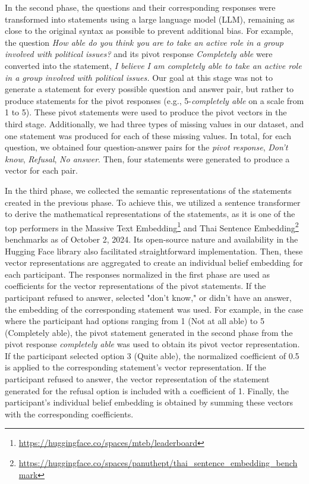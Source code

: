 In the second phase, the questions and their corresponding responses were transformed into statements using a large language model (LLM), remaining as close to the original syntax as possible to prevent additional bias. For example, the question \textit{How able do you think you are to take an active role in a group involved with political issues?} and its pivot response \textit{Completely able} were converted into the statement, \textit{I believe I am completely able to take an active role in a group involved with political issues.} Our goal at this stage was not to generate a statement for every possible question and answer pair, but rather to produce statements for the pivot responses (e.g., 5-\textit{completely able} on a scale from 1 to 5). These pivot statements were used to produce the pivot vectors in the third stage. Additionally, we had three types of missing values in our dataset, and one statement was produced for each of these missing values. In total, for each question, we obtained four question-answer pairs for the \textit{pivot response}, \textit{Don't know}, \textit{Refusal}, \textit{No answer}. Then, four statements were generated to produce a vector for each pair.

In the third phase, we collected the semantic representations of the statements created in the previous phase. To achieve this, we utilized a sentence transformer \cite[\textit{BGE-M3}]{chen2024bge} to derive the mathematical representations of the statements, as it is one of the top performers in the Massive Text Embedding\footnote{\url{https://huggingface.co/spaces/mteb/leaderboard}} and Thai Sentence Embedding\footnote{\url{https://huggingface.co/spaces/panuthept/thai_sentence_embedding_benchmark}} benchmarks as of October 2, 2024. Its open-source nature and availability in the Hugging Face library also facilitated straightforward implementation. Then, these vector representations are aggregated to create an individual belief embedding for each participant. The responses normalized in the first phase are used as coefficients for the vector representations of the pivot statements. If the participant refused to answer, selected "don't know," or didn't have an answer, the embedding of the corresponding statement was used. For example, in the case where the participant had options ranging from 1 (Not at all able) to 5 (Completely able), the pivot statement generated in the second phase from the pivot response \textit{completely able} was used to obtain its pivot vector representation. If the participant selected option 3 (Quite able), the normalized coefficient of 0.5 is applied to the corresponding statement's vector representation. If the participant refused to answer, the vector representation of the statement generated for the refusal option is included with a coefficient of 1. Finally, the participant's individual belief embedding is obtained by summing these vectors with the corresponding coefficients.

